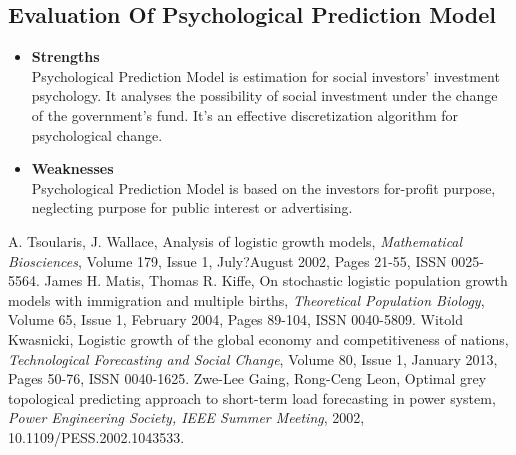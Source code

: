 \documentclass[tcn = 45538, sheet = true, abstract = true]{mcmthesis}
\begin{document}
\subsection{Evaluation Of Psychological Prediction Model}

\begin{itemize}

\item \textbf{Strengths} \\

Psychological Prediction Model is estimation for social investors' investment psychology. 
It analyses the possibility of social investment under the change of the government's fund. 
It's an effective discretization algorithm for psychological change.

\item \textbf{Weaknesses} \\

Psychological Prediction Model is based on the investors for-profit purpose, 
neglecting purpose for public interest or advertising.

\end{itemize}

\newpage

\begin{thebibliography}{}
 A. Tsoularis, J. Wallace, Analysis of logistic growth models, \emph{Mathematical Biosciences}, Volume 179, Issue 1, July?August 2002, Pages 21-55, ISSN 0025-5564.
 James H. Matis, Thomas R. Kiffe, On stochastic logistic population growth models with immigration and multiple births, \emph{Theoretical Population Biology}, Volume 65, Issue 1, February 2004, Pages 89-104, ISSN 0040-5809.
 Witold Kwasnicki, Logistic growth of the global economy and competitiveness of nations, \emph{Technological Forecasting and Social Change}, Volume 80, Issue 1, January 2013, Pages 50-76, ISSN 0040-1625.
 Zwe-Lee Gaing, Rong-Ceng Leon, Optimal grey topological predicting approach to short-term load forecasting in power system, \emph{Power Engineering Society, IEEE Summer Meeting}, 2002, 10.1109/PESS.2002.1043533.
\end{thebibliography}
\end{document}
